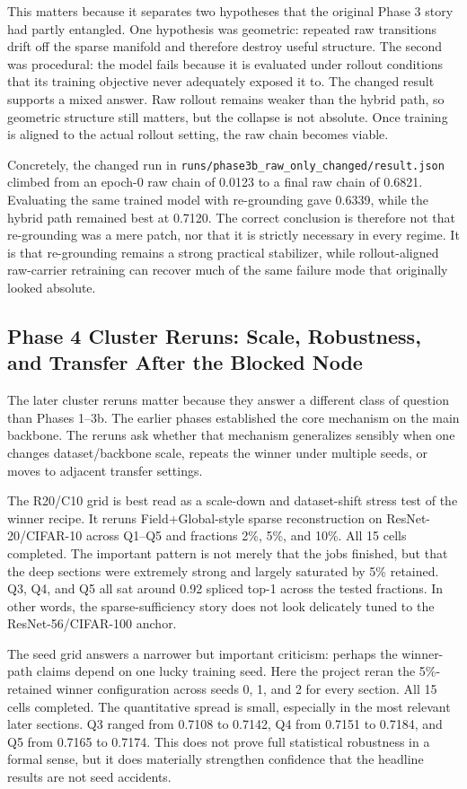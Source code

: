 \documentclass[11pt]{article}
\begin{document}
This matters because it separates two hypotheses that the original Phase 3 story had partly entangled. One hypothesis was geometric: repeated raw transitions drift off the sparse manifold and therefore destroy useful structure. The second was procedural: the model fails because it is evaluated under rollout conditions that its training objective never adequately exposed it to. The changed result supports a mixed answer. Raw rollout remains weaker than the hybrid path, so geometric structure still matters, but the collapse is not absolute. Once training is aligned to the actual rollout setting, the raw chain becomes viable.

Concretely, the changed run in \texttt{runs/phase3b\_raw\_only\_changed/result.json} climbed from an epoch-0 raw chain of 0.0123 to a final raw chain of 0.6821. Evaluating the same trained model with re-grounding gave 0.6339, while the hybrid path remained best at 0.7120. The correct conclusion is therefore not that re-grounding was a mere patch, nor that it is strictly necessary in every regime. It is that re-grounding remains a strong practical stabilizer, while rollout-aligned raw-carrier retraining can recover much of the same failure mode that originally looked absolute.

\subsection{Phase 4 Cluster Reruns: Scale, Robustness, and Transfer After the Blocked Node}
The later cluster reruns matter because they answer a different class of question than Phases 1--3b. The earlier phases established the core mechanism on the main backbone. The reruns ask whether that mechanism generalizes sensibly when one changes dataset/backbone scale, repeats the winner under multiple seeds, or moves to adjacent transfer settings.

The R20/C10 grid is best read as a scale-down and dataset-shift stress test of the winner recipe. It reruns Field+Global-style sparse reconstruction on ResNet-20/CIFAR-10 across Q1--Q5 and fractions 2\%, 5\%, and 10\%. All 15 cells completed. The important pattern is not merely that the jobs finished, but that the deep sections were extremely strong and largely saturated by 5\% retained. Q3, Q4, and Q5 all sat around 0.92 spliced top-1 across the tested fractions. In other words, the sparse-sufficiency story does not look delicately tuned to the ResNet-56/CIFAR-100 anchor.

The seed grid answers a narrower but important criticism: perhaps the winner-path claims depend on one lucky training seed. Here the project reran the 5\%-retained winner configuration across seeds 0, 1, and 2 for every section. All 15 cells completed. The quantitative spread is small, especially in the most relevant later sections. Q3 ranged from 0.7108 to 0.7142, Q4 from 0.7151 to 0.7184, and Q5 from 0.7165 to 0.7174. This does not prove full statistical robustness in a formal sense, but it does materially strengthen confidence that the headline results are not seed accidents.
\end{document}
